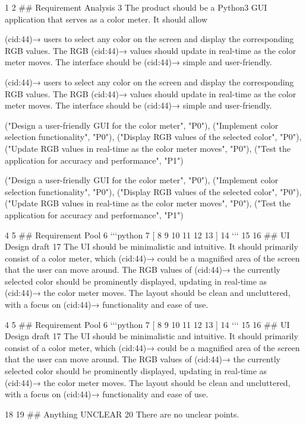 \documentclass[12pt]{article}
\begin{document}
1
2 \#\# Requirement Analysis
3 The product should be a Python3 GUI application that serves as a color meter. It should allow


(cid:44)→ users to select any color on the screen and display the corresponding RGB values. The RGB
(cid:44)→ values should update in real-time as the color meter moves. The interface should be
(cid:44)→ simple and user-friendly.


(cid:44)→ users to select any color on the screen and display the corresponding RGB values. The RGB
(cid:44)→ values should update in real-time as the color meter moves. The interface should be
(cid:44)→ simple and user-friendly.


("Design a user-friendly GUI for the color meter", "P0"),
("Implement color selection functionality", "P0"),
("Display RGB values of the selected color", "P0"),
("Update RGB values in real-time as the color meter moves", "P0"),
("Test the application for accuracy and performance", "P1")


("Design a user-friendly GUI for the color meter", "P0"),
("Implement color selection functionality", "P0"),
("Display RGB values of the selected color", "P0"),
("Update RGB values in real-time as the color meter moves", "P0"),
("Test the application for accuracy and performance", "P1")


4
5 ## Requirement Pool
6 ‘‘‘python
7 [
8
9
10
11
12
13 ]
14 ‘‘‘
15
16 ## UI Design draft
17 The UI should be minimalistic and intuitive. It should primarily consist of a color meter, which
(cid:44)→ could be a magnified area of the screen that the user can move around. The RGB values of
(cid:44)→ the currently selected color should be prominently displayed, updating in real-time as
(cid:44)→ the color meter moves. The layout should be clean and uncluttered, with a focus on
(cid:44)→ functionality and ease of use.


4
5 \#\# Requirement Pool
6 ‘‘‘python
7 [
8
9
10
11
12
13 ]
14 ‘‘‘
15
16 \#\# UI Design draft
17 The UI should be minimalistic and intuitive. It should primarily consist of a color meter, which
(cid:44)→ could be a magnified area of the screen that the user can move around. The RGB values of
(cid:44)→ the currently selected color should be prominently displayed, updating in real-time as
(cid:44)→ the color meter moves. The layout should be clean and uncluttered, with a focus on
(cid:44)→ functionality and ease of use.


18
19 ## Anything UNCLEAR
20 There are no unclear points.
\end{document}
